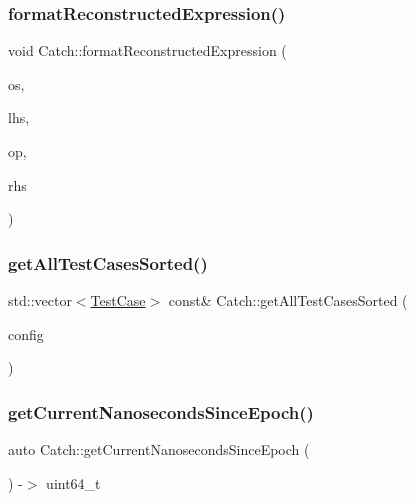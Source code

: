 \mbox{\label{namespaceCatch_a520110c31f26cf9892595772ab814fc0}} 
\subsubsection{\texorpdfstring{format\+Reconstructed\+Expression()}{formatReconstructedExpression()}}
{\footnotesize\ttfamily void Catch\+::format\+Reconstructed\+Expression (\begin{DoxyParamCaption}\item[{std\+::ostream \&}]{os,  }\item[{std\+::string const \&}]{lhs,  }\item[{\mbox{\hyperlink{classCatch_1_1StringRef}{String\+Ref}}}]{op,  }\item[{std\+::string const \&}]{rhs }\end{DoxyParamCaption})}

\mbox{\label{namespaceCatch_a1c9b1a23bc947ea70ddaabf067276cf2}} 
\subsubsection{\texorpdfstring{get\+All\+Test\+Cases\+Sorted()}{getAllTestCasesSorted()}}
{\footnotesize\ttfamily std\+::vector$<$\mbox{\hyperlink{classCatch_1_1TestCase}{Test\+Case}}$>$ const\& Catch\+::get\+All\+Test\+Cases\+Sorted (\begin{DoxyParamCaption}\item[{I\+Config const \&}]{config }\end{DoxyParamCaption})}

\mbox{\label{namespaceCatch_a98d058468488c486a9cb5c8463f3ba29}} 
\subsubsection{\texorpdfstring{get\+Current\+Nanoseconds\+Since\+Epoch()}{getCurrentNanosecondsSinceEpoch()}}
{\footnotesize\ttfamily auto Catch\+::get\+Current\+Nanoseconds\+Since\+Epoch (\begin{DoxyParamCaption}{ }\end{DoxyParamCaption}) -\/$>$  uint64\+\_\+t}

